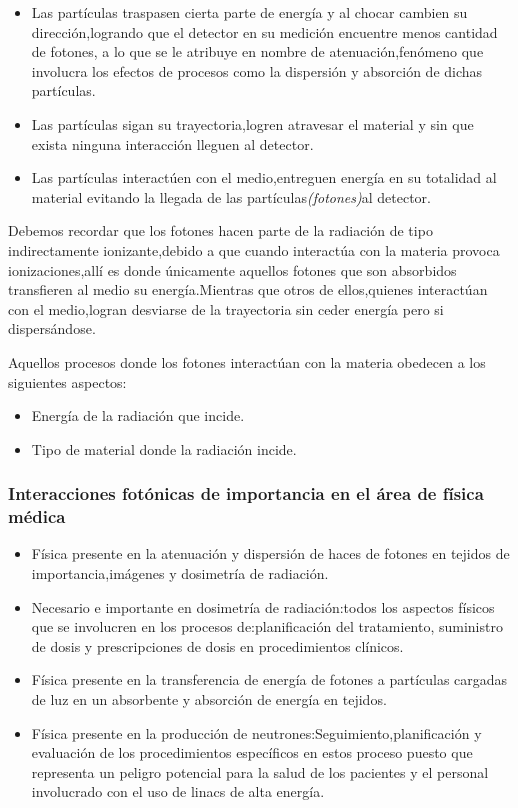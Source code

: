 \documentclass[12pt,fleqn]{book} %
\numberwithin{equation}{section} %
\numberwithin{figure}{section} %
\numberwithin{table}{section} %
\begin{document}
\begin{itemize}
 \item Las partículas traspasen cierta parte de energía y al chocar cambien su dirección,logrando que el detector en su medición encuentre menos cantidad de fotones, a lo que se le atribuye en nombre de atenuación,fenómeno que involucra los efectos de  procesos como la dispersión y absorción de dichas partículas.
 \item Las partículas sigan su trayectoria,logren atravesar el material y sin que exista ninguna interacción lleguen al detector.
 \item Las partículas interactúen con el medio,entreguen energía en su totalidad al material evitando la llegada de las partículas\textit{(fotones)}al detector.
 \end{itemize}


 Debemos recordar que los fotones hacen parte de la radiación de tipo indirectamente ionizante,debido a que  cuando interactúa con la materia  provoca ionizaciones,allí es donde únicamente aquellos fotones que son absorbidos transfieren al medio su energía.Mientras que otros de ellos,quienes interactúan con el medio,logran desviarse de la trayectoria sin ceder energía pero si dispersándose.
 
 
Aquellos  procesos donde los fotones interactúan con la materia obedecen a los siguientes aspectos:
\begin{itemize}
 \item Energía de la radiación que incide.
 \item Tipo de material donde la radiación incide.
\end{itemize}

\subsubsection{Interacciones fotónicas de importancia en el área de física médica }

\begin{itemize}
 \item Física presente en la atenuación y dispersión de haces de fotones en tejidos de importancia,imágenes y dosimetría de radiación.
 
 
\item Necesario e importante en dosimetría de radiación:todos los aspectos físicos que se involucren en los procesos de:planificación del tratamiento, suministro de dosis y prescripciones de dosis en procedimientos clínicos.

\item  Física presente en la transferencia de energía de fotones a partículas cargadas de luz en un absorbente y absorción de energía  en tejidos. 

\item Física presente en  la producción de neutrones:Seguimiento,planificación y evaluación de los procedimientos específicos en estos proceso puesto que representa un peligro potencial para la salud de los pacientes y el personal involucrado con el uso de linacs de alta energía.
\end{itemize}
\end{document}
